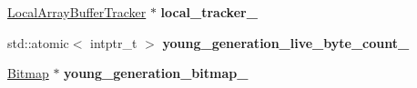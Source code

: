 \begin{DoxyCompactItemize}
\item 
\mbox{\label{classv8_1_1internal_1_1MemoryChunk_ad886af0d93e69c55f19e486cbee60b71}} 
\mbox{\hyperlink{classv8_1_1internal_1_1LocalArrayBufferTracker}{Local\+Array\+Buffer\+Tracker}} $\ast$ {\bfseries local\+\_\+tracker\+\_\+}
\item 
\mbox{\label{classv8_1_1internal_1_1MemoryChunk_ae3d6b792ea219e613a54a113a43cb3d0}} 
std\+::atomic$<$ intptr\+\_\+t $>$ {\bfseries young\+\_\+generation\+\_\+live\+\_\+byte\+\_\+count\+\_\+}
\item 
\mbox{\label{classv8_1_1internal_1_1MemoryChunk_ae982fb4bc78bbf9a1f73e2cd9fe3df25}} 
\mbox{\hyperlink{classv8_1_1internal_1_1Bitmap}{Bitmap}} $\ast$ {\bfseries young\+\_\+generation\+\_\+bitmap\+\_\+}
\end{DoxyCompactItemize}
